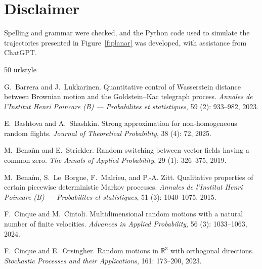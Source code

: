 \documentclass[10pt]{article}
\newcommand{\1}{1\!\!\!\;{\rm I}}
\theoremstyle{plain}
\theoremstyle{definition}
\numberwithin{equation}{section}
\begin{document}
\section*{Disclaimer}
Spelling and grammar were checked, and the Python code used to simulate the
trajectories presented in Figure~\ref{f:planar} was developed, with assistance from ChatGPT.


% 
% 


\begin{thebibliography}{50}
\providecommand{\natexlab}[1]{#1}
\providecommand{\url}[1]{\texttt{#1}}
\expandafter\ifx\csname urlstyle\endcsname\relax
  \providecommand{\doi}[1]{doi: #1}\else
  \providecommand{\doi}{doi: \begingroup \urlstyle{rm}\Url}\fi

G.~Barrera and J.~Lukkarinen.
\newblock Quantitative control of {W}asserstein distance between {B}rownian
  motion and the {G}oldstein--{K}ac telegraph process.
\newblock \emph{Annales de l'Institut Henri Poincare (B) --- Probabilites et
  statistiques}, 59 (2): 933--982, 2023.

E.~Bashtova and A.~Shashkin.
\newblock Strong approximation for non-homogeneous random flights.
\newblock \emph{Journal of Theoretical Probability}, 38 (4):
  72, 2025.

M.~Bena{\"i}m and E.~Strickler.
\newblock Random switching between vector fields having a common zero.
\newblock \emph{The Annals of Applied Probability}, 29 (1):
  326--375, 2019.

M.~Bena{\"i}m, S.~Le~Borgne, F.~Malrieu, and P.-A. Zitt.
\newblock Qualitative properties of certain piecewise deterministic {M}arkov
  processes.
\newblock \emph{Annales de l'Institut Henri Poincare (B) --- Probabilites et
  statistiques}, 51 (3): 1040--1075, 2015.

F.~Cinque and M.~Cintoli.
\newblock Multidimensional random motions with a natural number of finite
  velocities.
\newblock \emph{Advances in Applied Probability}, 56 (3):
  1033--1063, 2024.

F.~Cinque and E.~Orsingher.
\newblock Random motions in $\mathbb{R}^3$ with orthogonal directions.
\newblock \emph{Stochastic Processes and their Applications}, 161:
  173--200, 2023.


\end{thebibliography}
\end{document}
